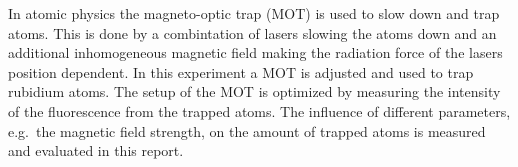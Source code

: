 In atomic physics the magneto-optic trap (MOT) is used to slow down and trap atoms. This is done by a combintation of lasers slowing the atoms down and an additional inhomogeneous magnetic field making the radiation force of the lasers position dependent. In this experiment a MOT is adjusted and used to trap rubidium atoms. The setup of the MOT is optimized by measuring the intensity of the fluorescence from the trapped atoms. The influence of different parameters, e.g.\ the magnetic field strength, on the amount of trapped atoms is measured and evaluated in this report. 
